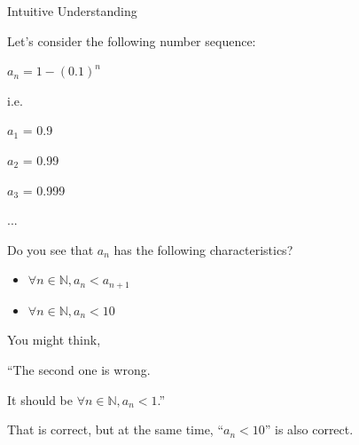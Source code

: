 %
%


\begin{frame}[c]{}{}
  {\large Intuitive Understanding}
\end{frame}

\begin{frame}[c]{}{}
  Let's consider the following number sequence:

  \vspace{2ex}

  $a_n = 1 - (0.1)^n$

  \vspace{2ex}

  i.e.

  $a_1$ = 0.9

  $a_2$ = 0.99

  $a_3$ = 0.999

  ...
\end{frame}

\begin{frame}[c]{}{}
  Do you see that $a_n$ has the following characteristics?

  \vspace{2ex}

  \begin{itemize}
  \item $\forall n \in \mathbb{N}, a_n < a_{n+1}$
  \item $\forall n \in \mathbb{N}, a_n < 10$
  \end{itemize}
\end{frame}

\begin{frame}[c]{}{}
  You might think,

  ``The second one is wrong.

  It should be $\forall n \in \mathbb{N}, a_n < 1$.''

  \vspace{2ex}

  That is correct, but at the same time, ``$a_n < 10$'' is also correct.
\end{frame}

